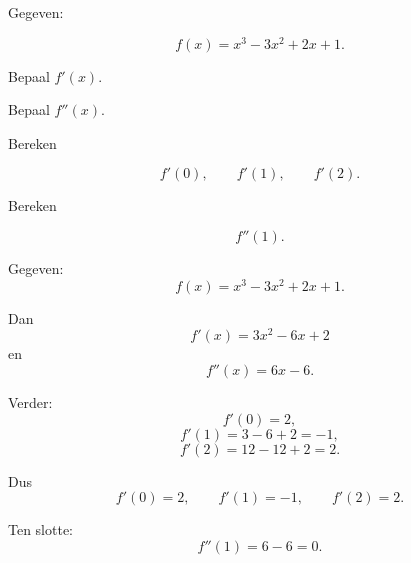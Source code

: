 \documentclass{ximera}
\begin{document}
\begin{oefening}{\oefB\ESS}

Gegeven:

\[
f(x)=x^3-3x^2+2x+1.
\]

\begin{question}
Bepaal $f'(x)$.
\end{question}

\begin{question}
Bepaal $f''(x)$.
\end{question}

\begin{question}
Bereken

\[
f'(0),\qquad f'(1),\qquad f'(2).
\]

\end{question}

\begin{question}
Bereken

\[
f''(1).
\]

\end{question}

\begin{oplossing}

Gegeven:
\[
f(x)=x^3-3x^2+2x+1.
\]

Dan
\[
\boxed{f'(x)=3x^2-6x+2}
\]
en
\[
\boxed{f''(x)=6x-6}.
\]

Verder:
\[
f'(0)=2,
\]
\[
f'(1)=3-6+2=-1,
\]
\[
f'(2)=12-12+2=2.
\]

Dus
\[
\boxed{f'(0)=2,\qquad f'(1)=-1,\qquad f'(2)=2}.
\]

Ten slotte:
\[
f''(1)=6-6=0.
\]

\end{oplossing}

\end{oefening}


\end{document}
